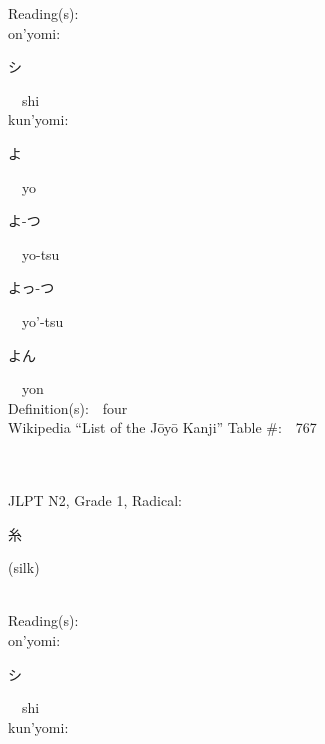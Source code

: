 \begin{multicols}{2}
Reading(s):\ \ \\
{\hspace*{1em}}on'yomi:\ \ \\
{\hspace*{2em}}{\begin{CJK}{UTF8}{min} シ \end{CJK}}\ \ shi\ \ \\
{\hspace*{1em}}kun'yomi:\ \ \\
{\hspace*{2em}}{\begin{CJK}{UTF8}{min} よ \end{CJK}}\ \ yo\ \ \\
{\hspace*{2em}}{\begin{CJK}{UTF8}{min} よ-つ \end{CJK}}\ \ yo-tsu\ \ \\
{\hspace*{2em}}{\begin{CJK}{UTF8}{min} よっ-つ \end{CJK}}\ \ yo'-tsu\ \ \\
{\hspace*{2em}}{\begin{CJK}{UTF8}{min} よん \end{CJK}}\ \ yon\ \ \\
Definition(s):\ \ four \\
Wikipedia ``List of the J\=oy\=o Kanji'' Table \#:\ \ 767 \\
\ \ \\
{\fontsize{34pt}{40pt}  }\ \ \\  %
{JLPT N2, Grade 1, Radical:\ \ {\begin{CJK}{UTF8}{min} 糸 \end{CJK}} (silk) } \\
Reading(s):\ \ \\
{\hspace*{1em}}on'yomi:\ \ \\
{\hspace*{2em}}{\begin{CJK}{UTF8}{min} シ \end{CJK}}\ \ shi\ \ \\
{\hspace*{1em}}kun'yomi:\ \ \\

\end{multicols}
